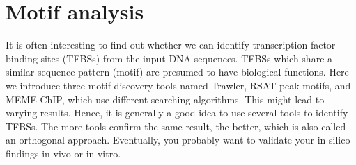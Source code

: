 
\section{Motif analysis}

\begin{information}
It is often interesting to find out whether we can identify transcription factor binding sites (TFBSs) from the input DNA sequences. TFBSs which share a similar sequence pattern (motif) are presumed to have biological functions. Here we introduce three motif discovery tools named Trawler, RSAT peak-motifs, and MEME-ChIP, which use different searching algorithms. This might lead to varying results. Hence, it is generally a good idea to use several tools to identify TFBSs. The more tools confirm the same result, the better, which is also called an orthogonal approach. Eventually, you probably want to validate your in silico findings in vivo or in vitro.

\end{information}

